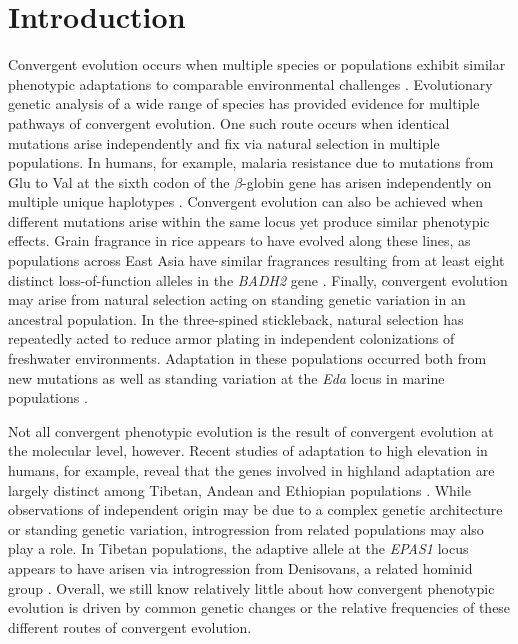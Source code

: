 \section*{Introduction}
\noindent Convergent evolution occurs when multiple species or populations exhibit similar phenotypic adaptations to comparable environmental challenges \cite[]{Wood_2005_15881688,Arendt_2008_18022278,Elmer_2011_21459472}.
Evolutionary genetic analysis of a wide range of species has provided evidence for multiple pathways of convergent evolution. 
One such route occurs when identical mutations arise independently and fix via natural selection in multiple populations. 
In humans, for example, malaria resistance due to mutations from Glu to Val at the sixth codon of the $\beta$-globin gene has arisen independently on multiple unique haplotypes  \cite[]{Currat_2002_11741197,Kwiatkowski_2005_16001361}.  
Convergent evolution can also be achieved when different mutations arise within the same locus yet produce similar phenotypic effects.  
Grain fragrance in rice appears to have evolved along these lines, as populations across East Asia have similar fragrances resulting from at least eight distinct loss-of-function alleles in the  \emph{BADH2} gene \cite[]{Kovach_2009_19706531}.  
Finally, convergent evolution may arise from natural selection acting on standing genetic variation in an ancestral population.  
In the three-spined stickleback, natural selection has repeatedly acted to reduce armor plating in independent colonizations of freshwater environments.  
Adaptation in these populations occurred both from new mutations as well as standing variation at the \emph{Eda} locus in marine populations \cite[]{Colosimo_2005_15790847}.  

Not all convergent phenotypic evolution is the result of convergent evolution at the molecular level, however.  
Recent studies of adaptation to high elevation in humans, for example, reveal that the genes involved in highland adaptation are largely distinct among Tibetan, Andean and Ethiopian populations \cite[]{Bigham_2010_20838600,Scheinfeldt_2012_22264333,Alkorta-Aranburu_2012_23236293}. 
While observations of independent origin may be due to a complex genetic architecture or standing genetic variation, introgression from related populations may also play a role.  
In Tibetan populations, the adaptive allele at the \emph{EPAS1} locus appears to have arisen via introgression from Denisovans, a related hominid group \cite[]{huerta2014altitude}.
Overall, we still know relatively little about how convergent phenotypic evolution is driven by common genetic changes or the relative frequencies of these different routes of convergent evolution.

